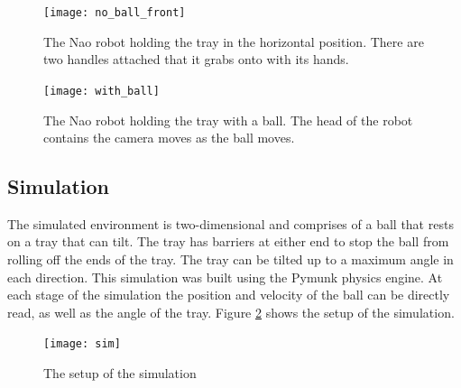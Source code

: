 \documentclass[12pt,a4paper]{article}
\begin{document}
\begin{figure}[H]
\centering
\begin{minipage}[t]{.45\textwidth}
  \centering
  \texttt{[image: no\_ball\_front]}
  \caption{The Nao robot holding the tray in the horizontal position. There are two handles attached that it grabs onto with its hands.}
  \label{nao1}
\end{minipage}\quad
\begin{minipage}[t]{.45\textwidth}
  \centering
  \texttt{[image: with\_ball]}
  \caption{The Nao robot holding the tray with a ball. The head of the robot contains the camera moves as the ball moves.}
  \label{nao2}
\end{minipage}
\end{figure}

\subsection{Simulation}
The simulated environment is two-dimensional and comprises of a ball that rests on a tray that can tilt. The tray has barriers at either end to stop the ball from rolling off the ends of the tray. The tray can be tilted up to a maximum angle in each direction. This simulation was built using the Pymunk physics engine. At each stage of the simulation the position and velocity of the ball can be directly read, as well as the angle of the tray.  Figure \ref{sim} shows the setup of the simulation.
\begin{figure}[H]
	\centering
	\texttt{[image: sim]}
	\caption{The setup of the simulation}
	\label{sim}
\end{figure}
\end{document}
